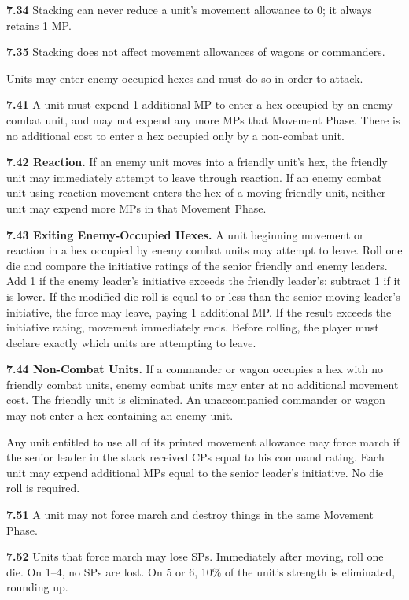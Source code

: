 \textbf{7.34} Stacking can never reduce a unit's movement allowance to 0; it always retains 1 MP.

\textbf{7.35} Stacking does not affect movement allowances of wagons or commanders.


Units may enter enemy-occupied hexes and must do so in order to attack.

\textbf{7.41} A unit must expend 1 additional MP to enter a hex occupied by an enemy combat unit, and may not expend any more MPs that Movement Phase. There is no additional cost to enter a hex occupied only by a non-combat unit.

\textbf{7.42 Reaction.} If an enemy unit moves into a friendly unit's hex, the friendly unit may immediately attempt to leave through reaction. If an enemy combat unit using reaction movement enters the hex of a moving friendly unit, neither unit may expend more MPs in that Movement Phase.

\textbf{7.43 Exiting Enemy-Occupied Hexes.} A unit beginning movement or reaction in a hex occupied by enemy combat units may attempt to leave. Roll one die and compare the initiative ratings of the senior friendly and enemy leaders. Add 1 if the enemy leader's initiative exceeds the friendly leader's; subtract 1 if it is lower. If the modified die roll is equal to or less than the senior moving leader's initiative, the force may leave, paying 1 additional MP. If the result exceeds the initiative rating, movement immediately ends. Before rolling, the player must declare exactly which units are attempting to leave.

\textbf{7.44 Non-Combat Units.} If a commander or wagon occupies a hex with no friendly combat units, enemy combat units may enter at no additional movement cost. The friendly unit is eliminated. An unaccompanied commander or wagon may not enter a hex containing an enemy unit.


Any unit entitled to use all of its printed movement allowance may force march if the senior leader in the stack received CPs equal to his command rating. Each unit may expend additional MPs equal to the senior leader's initiative. No die roll is required.

\textbf{7.51} A unit may not force march and destroy things in the same Movement Phase.

\textbf{7.52} Units that force march may lose SPs. Immediately after moving, roll one die. On 1--4, no SPs are lost. On 5 or 6, 10\% of the unit's strength is eliminated, rounding up.
